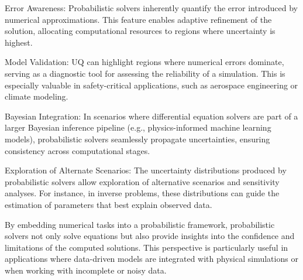 Error Awareness:
Probabilistic solvers inherently quantify the error introduced by numerical approximations. This feature enables adaptive refinement of the solution, allocating computational resources to regions where uncertainty is highest.

Model Validation:
UQ can highlight regions where numerical errors dominate, serving as a diagnostic tool for assessing the reliability of a simulation. This is especially valuable in safety-critical applications, such as aerospace engineering or climate modeling.

Bayesian Integration:
In scenarios where differential equation solvers are part of a larger Bayesian inference pipeline (e.g., physics-informed machine learning models), probabilistic solvers seamlessly propagate uncertainties, ensuring consistency across computational stages.

Exploration of Alternate Scenarios:
The uncertainty distributions produced by probabilistic solvers allow exploration of alternative scenarios and sensitivity analyses. For instance, in inverse problems, these distributions can guide the estimation of parameters that best explain observed data.

By embedding numerical tasks into a probabilistic framework, probabilistic solvers not only solve equations but also provide insights into the confidence and limitations of the computed solutions. This perspective is particularly useful in applications where data-driven models are integrated with physical simulations or when working with incomplete or noisy data.








% 

% 

% 

